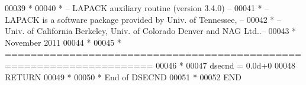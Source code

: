 \begin{DoxyCode}
00039 \textcolor{comment}{*}
00040 \textcolor{comment}{*  -- LAPACK auxiliary routine (version 3.4.0) --}
00041 \textcolor{comment}{*  -- LAPACK is a software package provided by Univ. of Tennessee,    --}
00042 \textcolor{comment}{*  -- Univ. of California Berkeley, Univ. of Colorado Denver and NAG Ltd..--}
00043 \textcolor{comment}{*     November 2011}
00044 \textcolor{comment}{*}
00045 \textcolor{comment}{* =====================================================================}
00046 \textcolor{comment}{*}
00047       dsecnd = 0.0d+0
00048       \textcolor{keywordflow}{RETURN}
00049 \textcolor{comment}{*}
00050 \textcolor{comment}{*     End of DSECND}
00051 \textcolor{comment}{*}
00052 \textcolor{keyword}{      END}
\end{DoxyCode}
